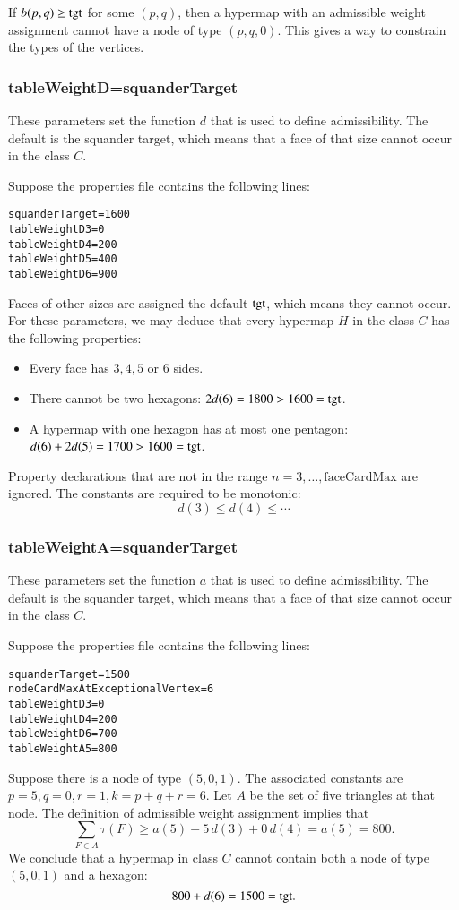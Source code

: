 \begin{example} If $b(p,q)\ge{\operatorname{tgt}}$ for some $(p,q)$, then a hypermap with
an admissible weight assignment cannot have a node of type $(p,q,0)$.  This gives
a way to constrain the types of the vertices.
\end{example}

\subsubsection{tableWeightD\wild =squanderTarget}

These parameters set the function $d$ that is used to define admissibility.
The default is the squander target, which means that a face of that size cannot occur
in the class $C$.

\begin{example} Suppose the properties file contains the following lines:
\begin{verbatim}
squanderTarget=1600
tableWeightD3=0
tableWeightD4=200
tableWeightD5=400
tableWeightD6=900
\end{verbatim}
Faces of other sizes are assigned the default ${\operatorname{tgt}}$, 
which means they cannot occur.  
For these parameters, 
we may deduce that
every hypermap $H$ in the class $C$ has the following properties:
\begin{itemize}
\item Every face has $3,4,5$ or $6$ sides.
\item There cannot be two hexagons: $2d(6) =1800 > 1600={\operatorname{tgt}}$.
\item A hypermap with one hexagon has at most one pentagon: $d(6)+2d(5) = 1700 > 1600 = {\operatorname{tgt}}$.
\end{itemize}
\end{example}
Property declarations 
that are not in the range $n=3,\ldots,\text{faceCardMax}$ are ignored.
The constants are required to be monotonic:
\[
d(3) \le d(4) \le \cdots
\]

\subsubsection{tableWeightA\wild =squanderTarget}

These parameters set the function $a$ that is used to define admissibility.
The default is the squander target, which means that a face of that size cannot occur
in the class $C$.

\begin{example} Suppose the properties file contains the following lines:
\begin{verbatim}
squanderTarget=1500
nodeCardMaxAtExceptionalVertex=6
tableWeightD3=0
tableWeightD4=200
tableWeightD6=700
tableWeightA5=800
\end{verbatim}
Suppose there is a node of type $(5,0,1)$. The associated constants
are $p=5,q=0,r=1,k=p+q+r=6$.
Let  $A$ be the set of five triangles at that node.  The definition of admissible
weight assignment implies that
\[
\sum_{F\in A}\tau(F) \ge a(5) + 5\, d(3) + 0\, d(4) = a(5) = 800.
\]
We conclude that a hypermap in class $C$ cannot contain both a node of type $(5,0,1)$
and a hexagon: 
\[
800 + d(6) = 1500 = {\operatorname{tgt}}.
\]
\end{example}

